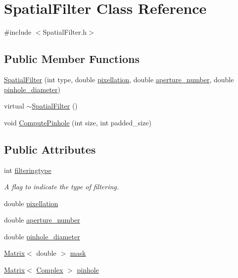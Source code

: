 \hypertarget{classSpatialFilter}{
\section{SpatialFilter Class Reference}
\label{classSpatialFilter}
}


{\ttfamily \#include $<$SpatialFilter.h$>$}

\subsection*{Public Member Functions}
\begin{DoxyCompactItemize}
\item 
\hyperlink{classSpatialFilter_ac08f42ea89b706f9c9fbca1ce7a40332}{SpatialFilter} (int type, double \hyperlink{classSpatialFilter_a7e72d04208866a30a7910f8871d6c716}{pixellation}, double \hyperlink{classSpatialFilter_a30dc6502152a5e08bef6b216fe3f039e}{aperture\_\-number}, double \hyperlink{classSpatialFilter_a814c422d8e4035e04fdbf8fd1472b8a0}{pinhole\_\-diameter})
\item 
virtual \hyperlink{classSpatialFilter_a6859e45eb9f92ca7eba0e4e4817479de}{$\sim$SpatialFilter} ()
\item 
void \hyperlink{classSpatialFilter_a584f2516f5bd3e9ce6c805534efe701b}{ComputePinhole} (int size, int padded\_\-size)
\end{DoxyCompactItemize}
\subsection*{Public Attributes}
\begin{DoxyCompactItemize}
\item 
int \hyperlink{classSpatialFilter_a6f4926fc2561191946f284986d611a60}{filteringtype}
\begin{DoxyCompactList}\small\item\em A flag to indicate the type of filtering. \item\end{DoxyCompactList}\item 
double \hyperlink{classSpatialFilter_a7e72d04208866a30a7910f8871d6c716}{pixellation}
\item 
double \hyperlink{classSpatialFilter_a30dc6502152a5e08bef6b216fe3f039e}{aperture\_\-number}
\item 
double \hyperlink{classSpatialFilter_a814c422d8e4035e04fdbf8fd1472b8a0}{pinhole\_\-diameter}
\item 
\hyperlink{classMatrix}{Matrix}$<$ double $>$ \hyperlink{classSpatialFilter_afdd9b350fdcade39ee57d676eae3996f}{mask}
\item 
\hyperlink{classMatrix}{Matrix}$<$ \hyperlink{Matrix_8h_a37333e1628babc1863d6963489e5e9ea}{Complex} $>$ \hyperlink{classSpatialFilter_acb2a9b5b26d41de1d543708f35c0c0b0}{pinhole}
\end{DoxyCompactItemize}


